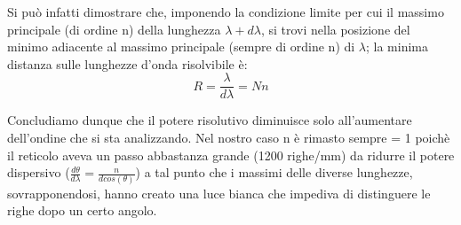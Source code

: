 \documentclass[a4paper]{article}
\theoremstyle{definition}
\begin{document}
\noindent Si può infatti dimostrare che, imponendo la condizione limite per cui il massimo principale (di ordine n) della lunghezza \(\lambda + d \lambda\), si trovi nella posizione del minimo adiacente al massimo principale (sempre di ordine n) di \(\lambda\); la minima distanza sulle lunghezze d'onda risolvibile è:
\[R = \frac{\lambda}{d \lambda} = Nn\]

\noindent Concludiamo dunque che il potere risolutivo diminuisce solo all'aumentare dell'ondine che si sta analizzando. Nel nostro caso n è rimasto sempre = 1 poichè il reticolo aveva un passo abbastanza grande (1200 righe/mm) da ridurre il potere dispersivo (\(\frac{d\theta}{d\lambda} = \frac{n}{dcos(\theta)}\)) a tal punto che i massimi delle diverse lunghezze, sovrapponendosi, hanno creato una luce bianca che impediva di distinguere le righe dopo un certo angolo.
\end{document}
